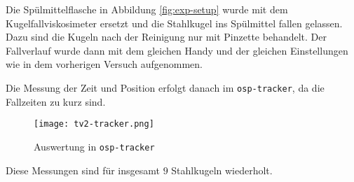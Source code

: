 		Die Spülmittelflasche in Abbildung \ref{fig:exp-setup} wurde mit dem Kugelfallviskosimeter ersetzt und die Stahlkugel ins Spülmittel fallen gelassen. Dazu sind die Kugeln nach der Reinigung nur mit Pinzette behandelt. Der Fallverlauf wurde dann mit dem gleichen Handy und der gleichen Einstellungen wie in dem vorherigen Versuch aufgenommen. 

		Die Messung der Zeit und Position erfolgt danach im \texttt{osp-tracker}, da die Fallzeiten zu kurz sind. 
		\begin{figure}[H]
			\centering
			\captionsetup{width=0.8\linewidth, justification=centering}
			\texttt{[image: tv2-tracker.png]}
			\caption{Auswertung in \texttt{osp-tracker}}
		\end{figure}
		Diese Messungen sind für insgesamt $9$ Stahlkugeln wiederholt. 
